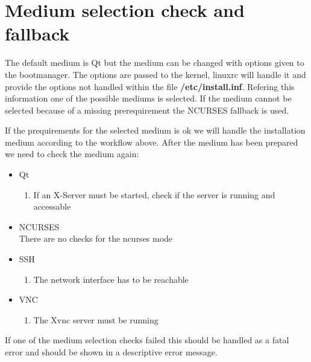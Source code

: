 \section{Medium selection check and fallback}
The default medium is Qt but the medium can be changed with options
given to the bootmanager. The options are passed to the kernel, linuxrc
will handle it and provide the options not handled within the
file \textbf{/etc/install.inf}. Refering this information one of the
possible mediums is selected. If the medium cannot be selected because
of a missing prerequirement the NCURSES fallback is used.

If the prequirements for the selected medium is ok we will handle the
installation medium according to the workflow above. After the medium
has been prepared we need to check the medium again:

\begin{itemize}
\item Qt
	\begin{enumerate}
	\item If an X-Server must be started, check if the server is running and
          accessable
	\end{enumerate}
\item NCURSES\\
    There are no checks for the ncurses mode
\item SSH
    \begin{enumerate}
    \item The network interface has to be reachable
    \end{enumerate}
\item VNC
    \begin{enumerate}
    \item The Xvnc server must be running
    \end{enumerate}
\end{itemize}

If one of the medium selection checks failed this should be handled as
a fatal error and should be shown in a descriptive error message.

